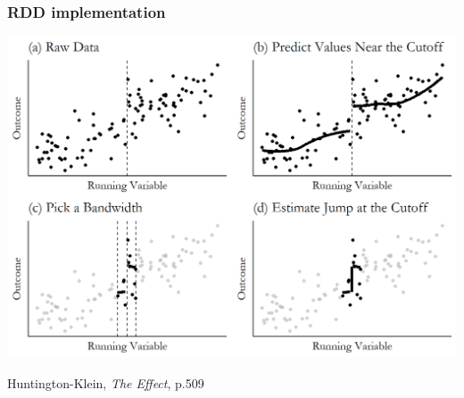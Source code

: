 \documentclass[aspectratio=43]{beamer}
\begin{document}
\begin{frame}
\frametitle{RDD implementation}
\centering

\includegraphics[width = \textwidth]{../img/rdd_procedure}

{\scriptsize Huntington-Klein, \textit{The Effect}, p.509}

\end{frame}
\end{document}
